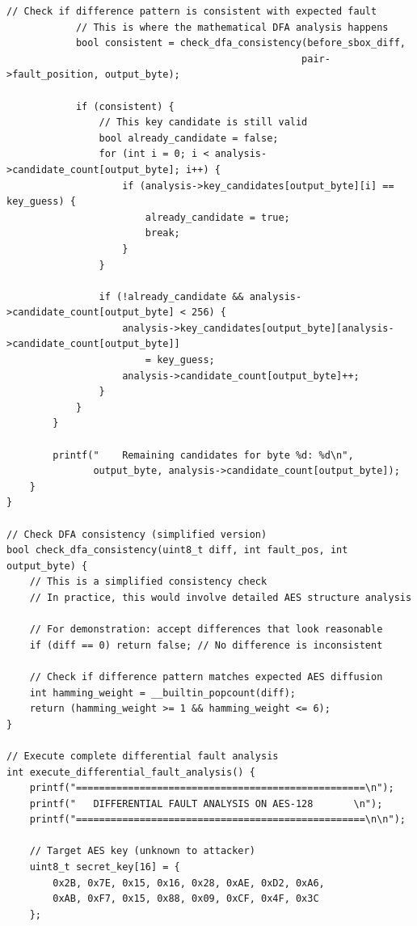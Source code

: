 \documentclass[12pt,a4paper]{article}
\begin{document}
\begin{lstlisting}[caption={Complete DFA Key Recovery Attack}]
            // Check if difference pattern is consistent with expected fault
            // This is where the mathematical DFA analysis happens
            bool consistent = check_dfa_consistency(before_sbox_diff, 
                                                   pair->fault_position, output_byte);
            
            if (consistent) {
                // This key candidate is still valid
                bool already_candidate = false;
                for (int i = 0; i < analysis->candidate_count[output_byte]; i++) {
                    if (analysis->key_candidates[output_byte][i] == key_guess) {
                        already_candidate = true;
                        break;
                    }
                }
                
                if (!already_candidate && analysis->candidate_count[output_byte] < 256) {
                    analysis->key_candidates[output_byte][analysis->candidate_count[output_byte]] 
                        = key_guess;
                    analysis->candidate_count[output_byte]++;
                }
            }
        }
        
        printf("    Remaining candidates for byte %d: %d\n", 
               output_byte, analysis->candidate_count[output_byte]);
    }
}

// Check DFA consistency (simplified version)
bool check_dfa_consistency(uint8_t diff, int fault_pos, int output_byte) {
    // This is a simplified consistency check
    // In practice, this would involve detailed AES structure analysis
    
    // For demonstration: accept differences that look reasonable
    if (diff == 0) return false; // No difference is inconsistent
    
    // Check if difference pattern matches expected AES diffusion
    int hamming_weight = __builtin_popcount(diff);
    return (hamming_weight >= 1 && hamming_weight <= 6);
}

// Execute complete differential fault analysis
int execute_differential_fault_analysis() {
    printf("==================================================\n");
    printf("   DIFFERENTIAL FAULT ANALYSIS ON AES-128       \n");  
    printf("==================================================\n\n");
    
    // Target AES key (unknown to attacker)
    uint8_t secret_key[16] = {
        0x2B, 0x7E, 0x15, 0x16, 0x28, 0xAE, 0xD2, 0xA6,
        0xAB, 0xF7, 0x15, 0x88, 0x09, 0xCF, 0x4F, 0x3C
    };
    

\end{lstlisting}
\end{document}
